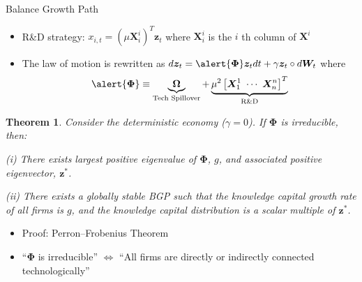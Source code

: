 \documentclass[
  10pt,               %
  aspectratio=169,    %
]{beamer}
\theoremstyle{plain}
\newtheorem*{thm*}{Theorem}
\begin{document}
\begin{frame}{Balance Growth Path}
  \begin{itemize}
    \item R\&D strategy: $x_{i,t}=\left(\mu \bm{X}_{i}^{i}\right)^{T}\bm{z}_{t}$
          where $\bm{X}_{i}^{i}$ is the $i$ th column of $\bm{X}^{i}$
    \item The law of motion is rewritten as $d\bm{z}_{t}=\alert{\bm{\Phi}}\bm{z}_{t}dt+\gamma\bm{z}_{t} \circ d\bm{W}_{t}$
          where
          \[
            \alert{\bm{\Phi}}\equiv\underbrace{\bm{\Omega}}_{\text{Tech Spillover}}+\underbrace{\mu^{2}\left[
              \bm{X}_{1}^{1} \ \cdots \ \bm{X}_{n}^{n}\right]^{T}}_{\text{R\&D}}
          \]
          \vspace{-5mm}
  \end{itemize}
  \begin{thm*}
    Consider the deterministic economy ($\gamma=0$). If \alert{$\bm{\Phi}$} is irreducible, then:

    (i) There exists largest positive eigenvalue of \alert{$\bm{\Phi}$}, $g$, and
    associated positive eigenvector, $\bm{z}^{*}$.

    (ii) There exists a globally stable BGP such that the knowledge capital
    growth rate of all firms is $g$, and the knowledge capital distribution
    is a scalar multiple of $\bm{z}^{*}$.
  \end{thm*}
  \begin{itemize}
    \item Proof: Perron--Frobenius Theorem
    \item ``\alert{$\bm{\Phi}$} is irreducible'' $\Longleftrightarrow$ ``All firms are
          directly or indirectly connected technologically''
  \end{itemize}
\end{frame}
%
\end{document}
